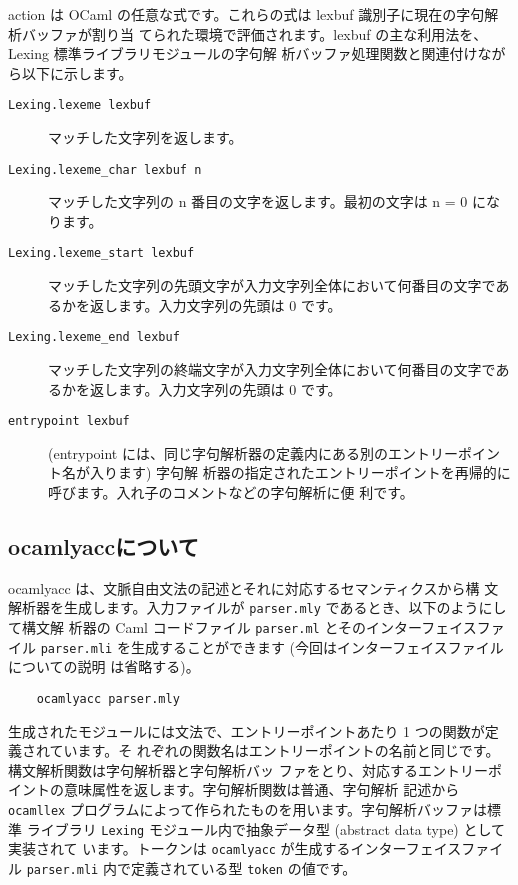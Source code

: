 \documentclass[a4paper,11pt]{jsarticle}
\begin{document}
action は OCaml の任意な式です。これらの式は lexbuf 識別子に現在の字句解析バッファが割り当
てられた環境で評価されます。lexbuf の主な利用法を、Lexing 標準ライブラリモジュールの字句解
析バッファ処理関数と関連付けながら以下に示します。

\begin{description}
\item [\texttt{Lexing.lexeme lexbuf}]
  マッチした文字列を返します。
\item [\texttt{Lexing.lexeme\_char lexbuf n}]
  マッチした文字列の n 番目の文字を返します。最初の文字は n = 0 になります。
\item [\texttt{Lexing.lexeme\_start lexbuf}]
  マッチした文字列の先頭文字が入力文字列全体において何番目の文字であるかを返します。入力文字列の先頭は 0 です。
\item [\texttt{Lexing.lexeme\_end lexbuf}]
  マッチした文字列の終端文字が入力文字列全体において何番目の文字であるかを返します。入力文字列の先頭は 0 です。
\item [\texttt{entrypoint lexbuf}]
  (entrypoint には、同じ字句解析器の定義内にある別のエントリーポイント名が入ります) 字句解
  析器の指定されたエントリーポイントを再帰的に呼びます。入れ子のコメントなどの字句解析に便
  利です。
\end{description}

\subsection{ocamlyaccについて}

ocamlyacc は、文脈自由文法の記述とそれに対応するセマンティクスから構
文解析器を生成します。入力ファイルが \verb|parser.mly|  であるとき、以下のようにして構文解
析器の Caml コードファイル \verb|parser.ml| とそのインターフェイスファイル
\verb|parser.mli|  を生成することができます (今回はインターフェイスファイルについての説明
は省略する)。

\begin{lstlisting}
    ocamlyacc parser.mly
\end{lstlisting}

生成されたモジュールには文法で、エントリーポイントあたり 1 つの関数が定義されています。そ
れぞれの関数名はエントリーポイントの名前と同じです。構文解析関数は字句解析器と字句解析バッ
ファをとり、対応するエントリーポイントの意味属性を返します。字句解析関数は普通、字句解析
記述から \verb|ocamllex| プログラムによって作られたものを用います。字句解析バッファは標準
ライブラリ \verb|Lexing| モジュール内で抽象データ型 (abstract data type) として実装されて
います。トークンは \verb|ocamlyacc| が生成するインターフェイスファイル \verb|parser.mli|
内で定義されている型 \verb|token| の値です。
\end{document}

